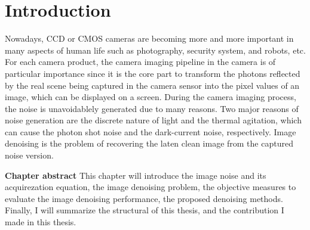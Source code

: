 %

\chapter{Introduction}
\label{sec:intro}

Nowadays, CCD or CMOS cameras are becoming more and more important in many aspects of human life such as photography, security system, and robots, etc. For each camera product, the camera imaging pipeline in the camera is of particular importance since it is the core part to transform the photons reflected by the real scene being captured in the camera sensor into the pixel values of an image, which can be displayed on a screen. During the camera imaging process, the noise is unavoidablely generated due to many reasons. Two major reasons of noise generation are the discrete nature of light and the thermal agitation, which can cause the photon shot noise and the dark-current noise, respectively. Image denoising is the problem of recovering the laten clean image from the captured noise version. 

\textbf{Chapter abstract} This chapter will introduce the image noise and its acquirezation equation, the image denoising problem, the objective measures to evaluate the image denoising performance, the proposed denoising methods. Finally, I will summarize the structural of this thesis, and the contribution I made in this thesis.




